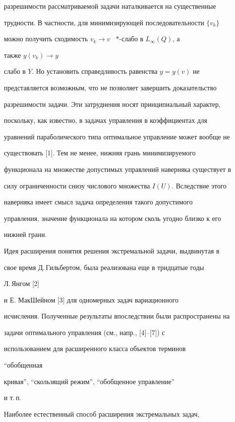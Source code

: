 разрешимости рассматриваемой задачи наталкивается на существенные 


трудности. В частности, для минимизирующей последовательности $\{v_k\}$ 


можно получить сходимость $v_k\to v$ \ $\ast$-слабо в $L_\infty(Q)$, а 


также $y(v_k)\to y$ 


слабо в $Y$. Но установить справедливость равенства $y=y(v)$ не 


представляется возможным, что не позволяет завершить доказательство 


разрешимости задачи. Эти затруднения носят принципиальный характер, 


поскольку, как известно, в задачах управления в коэффициентах для 


уравнений параболического типа оптимальное управление может вообще не 


существовать [1]. Тем не менее, нижняя грань минимизируемого 


функционала на множестве допустимых управлений наверняка существует в 


силу ограниченности снизу числового множества $I(U)$. Вследствие этого 


наверняка имеет смысл задача определения такого допустимого 


управления, значение функционала на котором сколь угодно близко к его 


нижней грани. 


 


Идея расширения понятия решения экстремальной задачи, выдвинутая в 


свое время Д.\,Гиль\-бер\-том, была реализована еще в тридцатые годы 


Л.\,Янгом [2]


и Е. МакШейном [3] для одномерных задач вариационного 


исчисления. Полученные результаты впоследствии были распространены на 


задачи оптимального управления (см., напр., [4]--[7]) с 


использованием для расширенного класса объектов терминов {\em 


``обобщенная 


кривая'', ``скользящий режим'', ``обобщенное управление''} и т.\,п. 


 


Наиболее естественный способ расширения экстремальных задач, 


